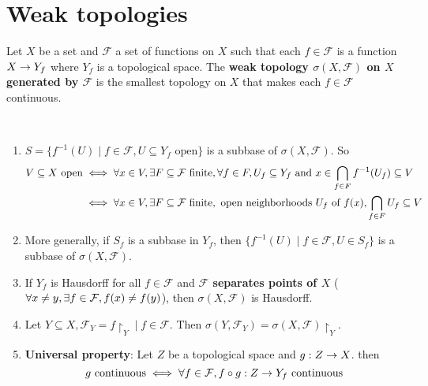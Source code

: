 \documentclass{article}
\begin{document}
\clearpage

\section{Weak topologies}
Let $X$ be a set and $\mathcal F$ a set of functions on $X$ such that each $f \in \mathcal F$ is a function $X \rightarrow Y_f$ where $Y_f$ is a topological space. The {\bf weak topology $\sigma(X, \mathcal F)$ on $X$ generated by $\mathcal F$} is the smallest topology on $X$ that makes each $f \in \mathcal F$ continuous.

\begin{rmks}~
  \begin{enumerate}
    \item $S = \{f^{-1}(U) \mid f \in \mathcal F, U \subseteq Y_f \text{ open}\}$ is a subbase of $\sigma(X, \mathcal F)$. So
    \begin{align*}
      V \subseteq X \text{ open}
      & \iff \forall x \in V, \exists F \subseteq \mathcal F \text{ finite}, \forall f \in F, U_f \subseteq Y_f \text{ and } x \in \bigcap_{f \in F} f^{-1}(U_f) \subseteq V \\
      & \iff \forall x \in V, \exists F \subseteq \mathcal F \text{ finite}, \text{ open neighborhoods } U_f \text{ of } f(x), \bigcap_{f \in F} U_f \subseteq V
    \end{align*}
    \item More generally, if $S_f$ is a subbase in $Y_f$, then $\{f^{-1}(U) \mid f \in \mathcal F, U \in S_f\}$ is a subbase of $\sigma(X, \mathcal F)$.
    \item If $Y_f$ is Hausdorff for all $f \in \mathcal F$ and {\bf $\mathcal F$ separates points of $X$} ($\forall x \ne y, \exists f \in \mathcal F, f(x) \ne f(y)$), then $\sigma(X, \mathcal F)$ is Hausdorff.
    \item Let $Y \subseteq X, \mathcal F_Y = {f\restriction_Y \mid f \in \mathcal F}$. Then $\sigma(Y, \mathcal F_Y) = \sigma(X, \mathcal F)\restriction_Y$.
    \item {\bf Universal property}: Let $Z$ be a topological space and $g : Z \rightarrow X$. then
    $$g \text{ continuous} \iff \forall f \in \mathcal F, f \circ g : Z \rightarrow Y_f \text{ continuous}$$
  \end{enumerate}
\end{rmks}
\end{document}
